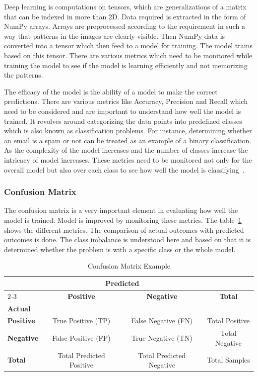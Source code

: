 Deep learning is computations on tensors, which are generalizations of a matrix that can be indexed in more than 2D. Data required is extracted in the form of NumPy arrays. Arrays are preprocessed according to the requirement in such a way that patterns in the images are clearly visible. Then NumPy data is converted into a tensor which then feed to a model for training. The model trains based on this tensor. There are various metrics which need to be monitored while training the model to see if the model is learning efficiently and not memorizing the patterns. 

The efficacy of the model is the ability of a model to make the correct predictions. There are various metrics like Accuracy, Precision and Recall which need to be considered and are important to understand how well the model is trained. It revolves around categorizing the data points into predefined classes which is also known as classification problems. For instance, determining whether an email is a spam or not can be treated as an example of a binary classification. As the complexity of the model increases and the number of classes increase the intricacy of model increases. These metrics need to be monitored not only for the overall model but also over each class to see how well the model is classifying~\cite{Efficacy}. 

\subsubsection{Confusion Matrix}
The confusion matrix is a very important element in evaluating how well the model is trained. Model is improved by monitoring these metrics. The table~\ref{tab:confusion_matrix} shows the different metrics. The comparison of actual outcomes with predicted outcomes is done. The class imbalance is understood here and based on that it is determined whether the problem is with a specific class or the whole model. 

\begin{table}[ht]
    \centering
    \begin{tabular}{l|c|c|c}
      \toprule
      & \multicolumn{2}{c}{\textbf{Predicted}} & \\
      \cmidrule(lr){2-3}
      & \textbf{Positive} & \textbf{Negative} & \textbf{Total} \\
      \midrule
      \textbf{Actual} \tabularnewline
      \textbf{Positive} & True Positive (TP) & False Negative (FN) & Total Positive \\
      \midrule
      \textbf{Negative} & False Positive (FP) & True Negative (TN) & Total Negative \\
      \midrule
      \textbf{Total} & Total Predicted Positive & Total Predicted Negative & Total Samples \\
      \bottomrule
    \end{tabular}
    \caption{Confusion Matrix Example}
    \label{tab:confusion_matrix}
  \end{table}

